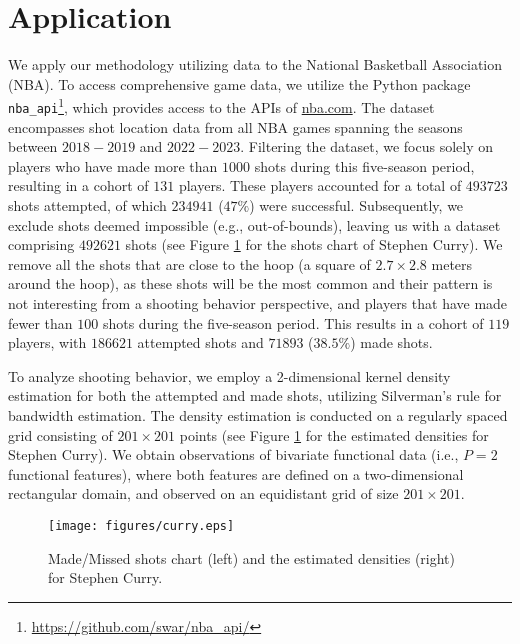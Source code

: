 \section{Application} %
\label{sec:application}

We apply our methodology utilizing data to the National Basketball Association (NBA). To access comprehensive game data, we utilize the Python package \texttt{nba\_api}\footnote{\url{https://github.com/swar/nba_api/}}, which provides access to the APIs of \url{nba.com}. The dataset encompasses shot location data from all NBA games spanning the seasons between $2018-2019$ and $2022-2023$. Filtering the dataset, we focus solely on players who have made more than $1000$ shots during this five-season period, resulting in a cohort of $131$ players. These players accounted for a total of $493723$ shots attempted, of which $234941$ ($47\%$) were successful. Subsequently, we exclude shots deemed impossible (e.g., out-of-bounds), leaving us with a dataset comprising $492621$ shots (see Figure \ref{fig:shoots_make_miss} for the shots chart of Stephen Curry). We remove all the shots that are close to the hoop (a square of $2.7 \times 2.8$ meters around the hoop), as these shots will be the most common and their pattern is not interesting from a shooting behavior perspective, and players that have made fewer than $100$ shots during the five-season period. This results in a cohort of $119$ players, with $186621$ attempted shots and $71893$ ($38.5\%$) made shots.

To analyze shooting behavior, we employ a 2-dimensional kernel density estimation for both the attempted and made shots, utilizing Silverman's rule \citep{silvermanDensityEstimationStatistics1986} for bandwidth estimation. The density estimation is conducted on a regularly spaced grid consisting of $201 \times 201$ points (see Figure \ref{fig:shoots_make_miss} for the estimated densities for Stephen Curry). We obtain observations of bivariate functional data (i.e., $P = 2$ functional features), where both features are defined on a two-dimensional rectangular domain, and observed on an equidistant grid of size $201 \times 201$.
\begin{figure}
    \centering
    \texttt{[image: figures/curry.eps]}
    \caption{Made/Missed shots chart (left) and the estimated densities (right) for Stephen Curry.}
    \label{fig:shoots_make_miss}
\end{figure}


